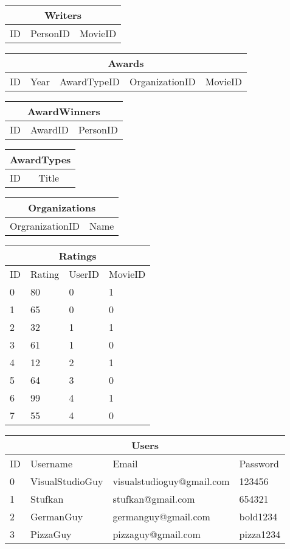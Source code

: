 \noindent\begin{tabular}{|l|l|l|}
\hline
\multicolumn{3}{|c|}{Writers} \\ \hline
ID & PersonID & MovieID\\ \hline
\end{tabular}

\noindent\begin{tabular}{|l|l|l|l|l|}
\hline
\multicolumn{5}{|c|}{Awards} \\ \hline
ID & Year & AwardTypeID & OrganizationID & MovieID \\ \hline
\end{tabular}

\noindent\begin{tabular}{|l|l|l|}
\hline
\multicolumn{3}{|c|}{AwardWinners} \\ \hline
ID & AwardID & PersonID \\ \hline
\end{tabular}

\noindent\begin{tabular}{|l|l|}
\hline
\multicolumn{2}{|c|}{AwardTypes} \\ \hline
ID & Title \\ \hline
\end{tabular}

\noindent\begin{tabular}{|l|l|}
\hline
\multicolumn{2}{|c|}{Organizations} \\ \hline
OrgranizationID & Name \\ \hline
\end{tabular}

\noindent\begin{tabular}{|l|l|l|l|}
\hline
\multicolumn{4}{|c|}{Ratings} \\ \hline
ID & Rating & UserID & MovieID \\ \hline \hline
0 & 80 & 0 & 1 \\ \hline
1 & 65 & 0 & 0 \\ \hline
2 & 32 & 1 & 1 \\ \hline
3 & 61 & 1 & 0 \\ \hline
4 & 12 & 2 & 1 \\ \hline
5 & 64 & 3 & 0 \\ \hline
6 & 99 & 4 & 1 \\ \hline
7 & 55 & 4 & 0 \\ \hline
\end{tabular}

\noindent\begin{tabular}{|l|l|l|l|}
\hline
\multicolumn{4}{|c|}{Users} \\ \hline
ID & Username & Email & Password \\ \hline \hline
0 & VisualStudioGuy & visualstudioguy@gmail.com & 123456 \\ \hline
1 & Stufkan & stufkan@gmail.com & 654321 \\ \hline
2 & GermanGuy & germanguy@gmail.com & bold1234 \\ \hline
3 & PizzaGuy & pizzaguy@gmail.com & pizza1234 \\ \hline
\end{tabular}

